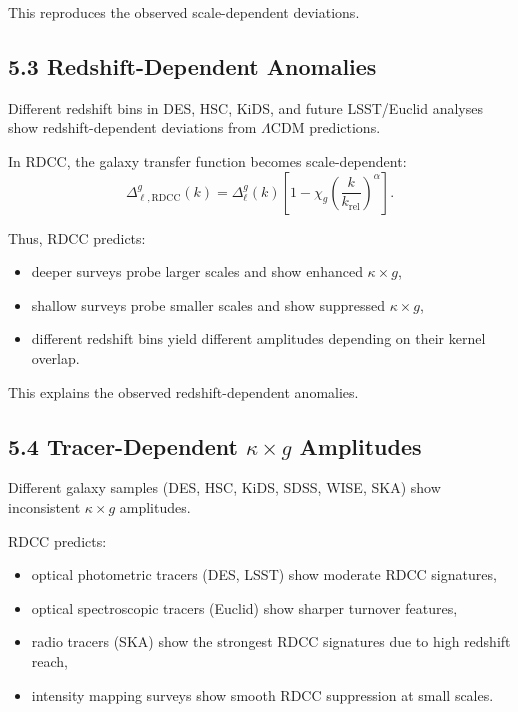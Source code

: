 \documentclass[11pt,a4paper]{article}
\begin{document}
This reproduces the observed scale-dependent deviations.

\subsection*{5.3 Redshift-Dependent Anomalies}

Different redshift bins in DES, HSC, KiDS, and future LSST/Euclid analyses show 
redshift-dependent deviations from $\Lambda$CDM predictions.

In RDCC, the galaxy transfer function becomes scale-dependent:
\begin{equation}
    \Delta_{\ell,\mathrm{RDCC}}^{g}(k)
    = \Delta_{\ell}^{g}(k)
      \left[
        1 - \chi_{g}
        \left(\frac{k}{k_{\mathrm{rel}}}\right)^{\alpha}
      \right].
\end{equation}

Thus, RDCC predicts:

\begin{itemize}
    \item deeper surveys probe larger scales and show enhanced $\kappa \times g$,
    \item shallow surveys probe smaller scales and show suppressed $\kappa \times g$,
    \item different redshift bins yield different amplitudes depending on their kernel overlap.
\end{itemize}

This explains the observed redshift-dependent anomalies.

\subsection*{5.4 Tracer-Dependent \texorpdfstring{$\kappa\times g$}{κ×g} Amplitudes}

Different galaxy samples (DES, HSC, KiDS, SDSS, WISE, SKA) show inconsistent 
$\kappa \times g$ amplitudes.

RDCC predicts:

\begin{itemize}
    \item optical photometric tracers (DES, LSST) show moderate RDCC signatures,
    \item optical spectroscopic tracers (Euclid) show sharper turnover features,
    \item radio tracers (SKA) show the strongest RDCC signatures due to high redshift reach,
    \item intensity mapping surveys show smooth RDCC suppression at small scales.
\end{itemize}
\end{document}
